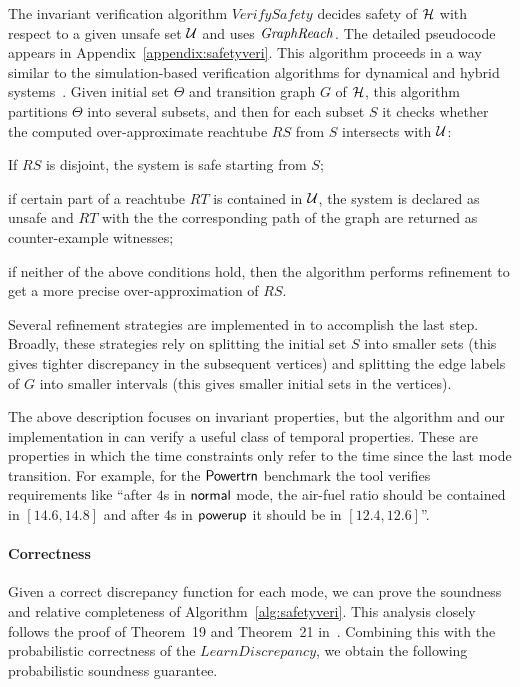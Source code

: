 The invariant verification algorithm $\mathit{VerifySafety}$ decides
safety of ${\mathcal H}$ with respect to a given unsafe set ${\mathcal U}$ and uses
$\mathit{GraphReach}$. The detailed pseudocode appears in
Appendix~\ref{appendix:safetyveri}.  This algorithm proceeds in a way
similar to the simulation-based verification algorithms for dynamical
and hybrid systems~\cite{DMV:EMSOFT2013,fan2016automatic}.
%
Given initial set $\Theta$ and transition graph $G$ of ${\mathcal H}$, this algorithm partitions $\Theta$ into several subsets, and then for each subset $S$ it checks whether the computed  over-approximate reachtube $RS$ from $S$ intersects with ${\mathcal U}$:
 \begin{inparaenum}[(a)]
 \item If $RS$  is disjoint, the system is safe starting from $S$; 
 \item if certain part of a reachtube $RT$ is contained in ${\mathcal U}$, the system is declared as  unsafe and $RT$ with the the corresponding path of the graph are returned as counter-example witnesses; 
 \item if neither of the above conditions hold, then the algorithm performs refinement to get a more precise over-approximation of $RS$.
 \end{inparaenum} 
Several refinement strategies are implemented in {\toolname} to
accomplish the last step.  Broadly, these strategies rely on splitting
the initial set $S$ into smaller sets (this gives tighter discrepancy
in the subsequent vertices) and splitting the edge labels of $G$ into
smaller intervals (this gives smaller initial sets in the vertices).
 
The above description focuses on invariant properties, but the
algorithm and our implementation in {\toolname} can verify a useful
class of temporal properties.  These are properties in which the time
constraints only refer to the time since the last mode transition.
%
For example, for the ${\operatorname{\mathsf{Powertrn}}}$ benchmark the tool verifies
requirements like ``after $4$s in $\Lmode{normal}$ mode, the air-fuel
ratio should be contained in $[14.6,14.8]$ and after $4$s in
$\Lmode{powerup}$ it should be in $[12.4,12.6]$''.

\vspace{-10pt}
\paragraph{Correctness}
Given a correct discrepancy function for each mode, we can prove the
soundness and relative completeness of
Algorithm~\ref{alg:safetyveri}. This analysis closely follows the
proof of Theorem~19 and Theorem~21
in~\cite{duggirala2015dynamic}. Combining this with the probabilistic
correctness of the $\mathit{LearnDiscrepancy}$, we obtain the
following probabilistic soundness guarantee.

